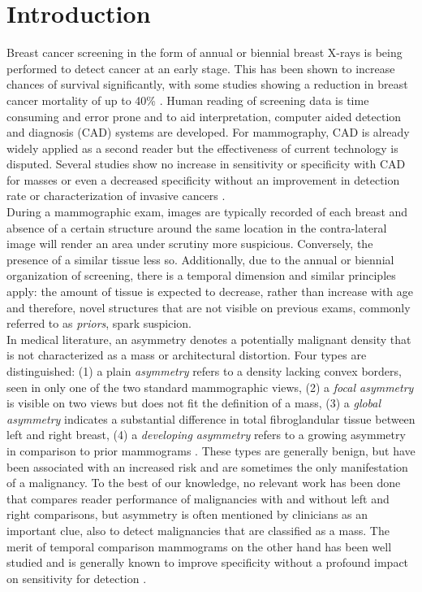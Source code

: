 \documentclass[12pt]{spieman}  %
\begin{document}
\section{Introduction}
\label{sec::introduction}
Breast cancer screening in the form of annual or biennial breast X-rays is being performed to detect cancer at an early stage. This has been shown to increase chances of survival significantly, with some studies showing a reduction in breast cancer mortality of up to 40\% \cite{Taba03}. Human reading of screening data is time consuming and error prone and to aid interpretation, computer aided detection and diagnosis (CAD) \cite{Gige01, Doi07, Doi05, Ginn11} systems are developed. For mammography, CAD is already widely applied as a second reader \cite{Rao10, Mali06} but the effectiveness of current technology is disputed. Several studies show no increase in sensitivity or specificity with CAD \cite{Tayl05b} for masses or even a decreased specificity without an improvement in detection rate or characterization of invasive cancers \cite{Fent11, Lehm15}. \\ 

During a mammographic exam, images are typically recorded of each breast and absence of a certain structure around the same location in the contra-lateral image will render an area under scrutiny more suspicious. Conversely, the presence of a similar tissue less so. Additionally, due to the annual or biennial organization of screening, there is a temporal dimension and similar principles apply: the amount of tissue is expected to decrease, rather than increase with age and therefore, novel structures that are not visible on previous exams, commonly referred to as {\it priors}, spark suspicion. \\

In medical literature, an asymmetry denotes a potentially malignant density that is not characterized as a mass or architectural distortion. Four types are distinguished: (1) a plain {\it asymmetry} refers to a density lacking convex borders, seen in only one of the two standard mammographic views, (2) a {\it focal asymmetry} is visible on two views but does not fit the definition of a mass, (3) a {\it global asymmetry} indicates a substantial difference in total fibroglandular tissue between left and right breast, (4) a {\it developing asymmetry} refers to a growing asymmetry in comparison to prior mammograms \cite{Sick07, Youk09}. These types are generally benign, but have been associated with an increased risk \cite{Scut06} and are sometimes the only manifestation of a malignancy. To the best of our knowledge, no relevant work has been done that compares reader performance of malignancies with and without left and right comparisons, but asymmetry is often mentioned by clinicians as an important clue, also to detect malignancies that are classified as a mass. The merit of temporal comparison mammograms on the other hand has been well studied and is generally known to improve specificity without a profound impact on sensitivity for detection \cite{Thur00, Burn02, Vare05, Roel07, Yank11}. \\
\end{document}
